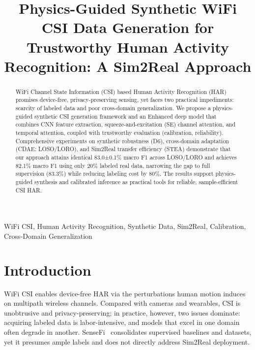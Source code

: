 \documentclass[journal]{IEEEtran}
\begin{document}
\title{Physics-Guided Synthetic WiFi CSI Data Generation for Trustworthy Human Activity Recognition: A Sim2Real Approach}

\author{
}

\maketitle

\begin{abstract}
WiFi Channel State Information (CSI) based Human Activity Recognition (HAR) promises device-free, privacy-preserving sensing, yet faces two practical impediments: scarcity of labeled data and poor cross-domain generalization. We propose a physics-guided synthetic CSI generation framework and an Enhanced deep model that combines CNN feature extraction, squeeze-and-excitation (SE) channel attention, and temporal attention, coupled with trustworthy evaluation (calibration, reliability). Comprehensive experiments on synthetic robustness (D6), cross-domain adaptation (CDAE: LOSO/LORO), and Sim2Real transfer efficiency (STEA) demonstrate that our approach attains identical 83.0±0.1\% macro F1 across LOSO/LORO and achieves 82.1\% macro F1 using only 20\% labeled real data, narrowing the gap to full supervision (83.3\%) while reducing labeling cost by 80\%. The results support physics-guided synthesis and calibrated inference as practical tools for reliable, sample-efficient CSI HAR.
\end{abstract}

\begin{IEEEkeywords}
WiFi CSI, Human Activity Recognition, Synthetic Data, Sim2Real, Calibration, Cross-Domain Generalization
\end{IEEEkeywords}

\section{Introduction}
WiFi CSI enables device-free HAR via the perturbations human motion induces on multipath wireless channels. Compared with cameras and wearables, CSI is unobtrusive and privacy-preserving; in practice, however, two issues dominate: acquiring labeled data is labor-intensive, and models that excel in one domain often degrade in another. SenseFi~\cite{yang2023sensefi} consolidates supervised baselines and datasets, yet it presumes ample labels and does not directly address Sim2Real deployment.
\end{document}
